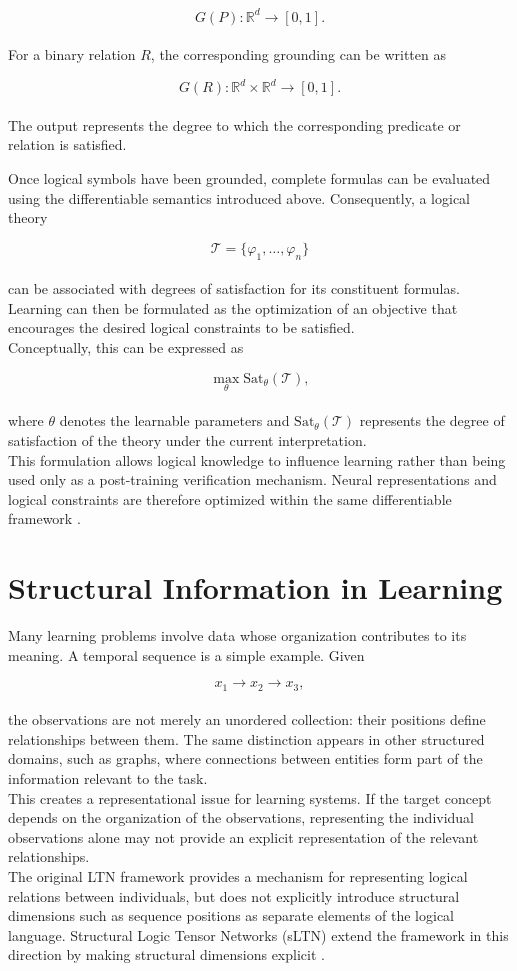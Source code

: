 $$
G(P):\mathbb{R}^{d}\rightarrow[0,1].
$$
\noindent\\
For a binary relation $R$, the corresponding grounding can be written as

$$
G(R):\mathbb{R}^{d}\times\mathbb{R}^{d}\rightarrow[0,1].
$$
\noindent\\
The output represents the degree to which the corresponding predicate or relation is satisfied.

\noindent
Once logical symbols have been grounded, complete formulas can be evaluated using the differentiable semantics introduced above. Consequently, a logical theory

$$
\mathcal{T}=\{\varphi_1,\ldots,\varphi_n\}
$$
\noindent\\
can be associated with degrees of satisfaction for its constituent formulas. Learning can then be formulated as the optimization of an objective that encourages the desired logical constraints to be satisfied.
\noindent\\
Conceptually, this can be expressed as

$$
\max_{\theta}\mathrm{Sat}_{\theta}(\mathcal{T}),
$$
\noindent\\
where $\theta$ denotes the learnable parameters and $\mathrm{Sat}_{\theta}(\mathcal{T})$ represents the degree of satisfaction of the theory under the current interpretation.
\noindent\\
This formulation allows logical knowledge to influence learning rather than being used only as a post-training verification mechanism. Neural representations and logical constraints are therefore optimized within the same differentiable framework \cite{badreddine2022logic}.

\section{Structural Information in Learning}

\noindent
Many learning problems involve data whose organization contributes to its meaning. A temporal sequence is a simple example. Given

$$
x_1 \rightarrow x_2 \rightarrow x_3,
$$
\noindent\\
the observations are not merely an unordered collection: their positions define relationships between them. The same distinction appears in other structured domains, such as graphs, where connections between entities form part of the information relevant to the task.
\noindent\\
This creates a representational issue for learning systems. If the target concept depends on the organization of the observations, representing the individual observations alone may not provide an explicit representation of the relevant relationships.
\noindent\\
The original LTN framework provides a mechanism for representing logical relations between individuals, but does not explicitly introduce structural dimensions such as sequence positions as separate elements of the logical language. Structural Logic Tensor Networks (sLTN) extend the framework in this direction by making structural dimensions explicit \cite{rinaldi2026sltn}.

